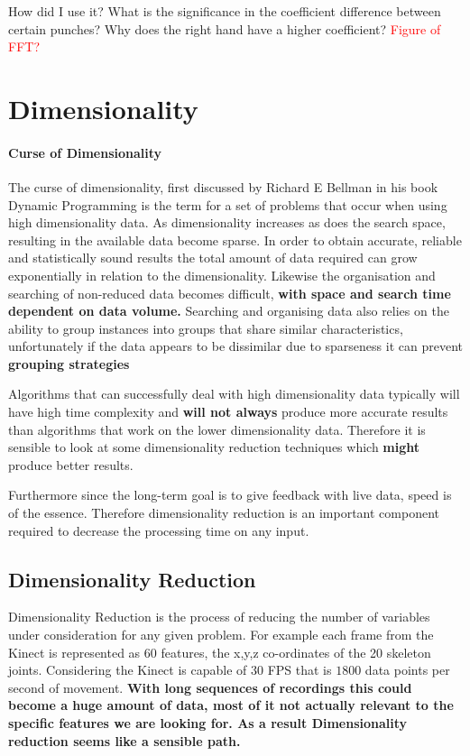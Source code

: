 {How did I use it? What is the significance in the coefficient difference between certain punches? Why does the right hand have a higher coefficient?}
\textcolor{red}{Figure of FFT?}


\section{Dimensionality}
\paragraph{Curse of Dimensionality}
The curse of dimensionality, first discussed by Richard E Bellman in his book Dynamic Programming\cite{dynprog} is the term for a set of problems that occur when using high dimensionality data. As dimensionality increases as does the search space, resulting in the available data become sparse. In order to obtain accurate, reliable and statistically sound results the total amount of data required can grow exponentially in relation to the dimensionality. Likewise the organisation and searching of non-reduced data becomes difficult, {\bf with space and search time dependent on data volume.} Searching and organising data also relies on the ability to group instances into groups that share similar characteristics, unfortunately if the data appears to be dissimilar due to sparseness it can prevent {\bf grouping strategies} 

Algorithms that can successfully deal with high dimensionality data typically will have high time complexity and {\bf will not always} produce more accurate results than algorithms that work on the lower dimensionality data. Therefore it is sensible to look at some dimensionality reduction techniques which {\bf might} produce better results.

Furthermore since the long-term goal is to give feedback with live data, speed is of the essence. Therefore dimensionality reduction is an important component required to decrease the processing time on any input.

\subsection{Dimensionality Reduction}
Dimensionality Reduction is the process of reducing the number of variables under consideration for any given problem. For example each frame from the Kinect is represented as 60 features, the x,y,z co-ordinates of the 20 skeleton joints. Considering the Kinect is capable of 30 FPS that is $1800$ data points per second of movement. {\bf With long sequences of recordings this could become a huge amount of data, most of it not actually relevant to the specific features we are looking for. As a result Dimensionality reduction seems like a sensible path.}

